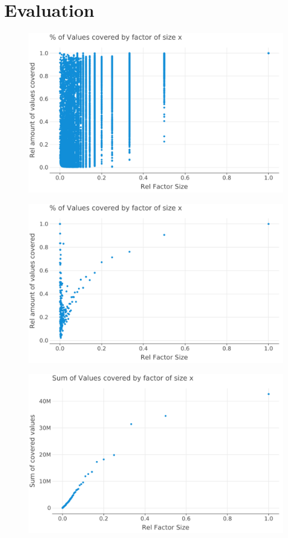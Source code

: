 
\chapter{Evaluation}
\label{ch:Evaluation}
\begin{figure}
	\includegraphics[width=\linewidth]{plots/SHORTEST_PERIODS-all-relative-values-by-factor-size.png}
\end{figure}
\begin{figure}
	\includegraphics[width=\linewidth]{plots/SHORTEST_PERIODS-all-relative-values-by-factor-size-average.png}
\end{figure}
\begin{figure}
	\includegraphics[width=\linewidth]{plots/GREEDY_SHORT_FACTORS-all-values-by-factor-size.png}
\end{figure}


